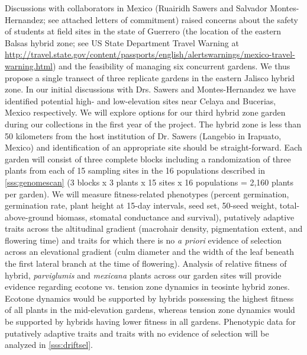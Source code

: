 Discussions with collaborators in Mexico (Ruairidh Sawers and Salvador Montes-Hernandez; see attached letters of commitment) raised concerns about the safety of students at field sites in the state of Guerrero (the location of the eastern Balsas hybrid zone; see US State Department Travel Warning at \url{http://travel.state.gov/content/passports/english/alertswarnings/mexico-travel-warning.html}) and the feasibility of managing six concurrent gardens. We thus propose a single transect of three replicate gardens in the eastern Jalisco hybrid zone. 
In our initial discussions with Drs. Sawers and Montes-Hernandez we have identified potential high- and low-elevation sites near Celaya and Bucerias, Mexico respectively.  
We will explore options for our third hybrid zone garden during our collections in the first year of the project.
The hybrid zone is less than 50 kilometers from the host institution of Dr. Sawers (Langebio in Irapuato, Mexico) and identification of an appropriate site should be straight-forward.
Each garden will consist of three complete blocks including a randomization of three plants from each of 15 sampling sites in the 16 populations described in \ref{sss:genomescan} (3 blocks x 3 plants x 15 sites x 16 populations = 2,160 plants per garden).  We will measure fitness-related phenotypes (percent germination, germination rate, plant height at 15-day intervals, seed set, 50-seed weight, total-above-ground biomass, stomatal conductance and survival), putatively adaptive traits across the altitudinal gradient (macrohair density, pigmentation extent, and flowering time) and traits for which there is no \emph{a priori} evidence of selection across an elevational gradient (culm diameter and the width of the leaf beneath the first lateral branch at the time of flowering).  Analysis of relative fitness of hybrid, \emph{parviglumis} and \emph{mexicana} plants across our garden sites will provide evidence regarding ecotone vs. tension zone dynamics in teosinte hybrid zones.  Ecotone dynamics would be supported by hybrids possessing the highest fitness of all plants in the mid-elevation gardens, whereas tension zone dynamics would be supported by hybrids having lower fitness in all gardens.  Phenotypic data for putatively adaptive traits and traits with no evidence of selection will be analyzed in \ref{sss:driftsel}.
		
